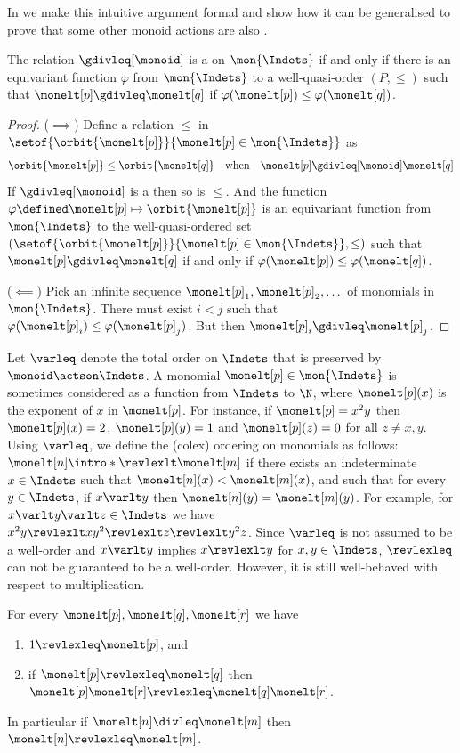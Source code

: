 In  we make this intuitive argument formal and show how it can be generalised to prove that some other monoid actions are also .
%
\begin{lemma}
The relation $\gdivleq[\monoid]$ is a  on $\mon{\Indets}$ if and only if there is an equivariant function $\varphi$ from $\mon{\Indets}$ to a well-quasi-order $(P,\leq)$ such that $\monelt[p] \gdivleq \monelt[q]$ if $\varphi(\monelt[p]) \leq \varphi(\monelt[q])$.
\end{lemma}
%
\begin{proof}
($\implies$)
Define a relation $\leq$ in $\setof{\orbit{\monelt[p]}}{\monelt[p]\in\mon{\Indets}}$ as
\[
\orbit{\monelt[p]} \leq \orbit{\monelt[q]}
\quad\text{when}\quad \monelt[p] \gdivleq[\monoid] \monelt[q]
\]
If $\gdivleq[\monoid]$ is a  then so is $\leq$.
And the function $\varphi \defined \monelt[p] \mapsto \orbit{\monelt[p]}$ is an equivariant function from $\mon{\Indets}$ to the well-quasi-ordered set $(\setof{\orbit{\monelt[p]}}{\monelt[p]\in\mon{\Indets}},\leq)$ such that $\monelt[p] \gdivleq \monelt[q]$ if and only if $\varphi(\monelt[p]) \leq \varphi(\monelt[q])$.

\noindent($\impliedby$)
Pick an infinite sequence $\monelt[p]_1,\monelt[p]_2,\dots$ of monomials in $\mon{\Indets}$.
There must exist $i < j$ such that $\varphi(\monelt[p]_i) \leq \varphi(\monelt[p]_j)$.
But then $\monelt[p]_i \gdivleq \monelt[p]_j$.
\end{proof}
%
Let $\varleq$ denote the total order on $\Indets$ that is preserved by $\monoid\actson\Indets$.
A monomial $\monelt[p]\in\mon{\Indets}$ is sometimes considered as a function from $\Indets$ to $\N$,
where $\monelt[p](x)$ is the exponent of $x$ in $\monelt[p]$.
For instance, if $\monelt[p] = x^2y$ then $\monelt[p](x) = 2$, $\monelt[p](y) = 1$ and $\monelt[p](z) = 0$ for all $z\neq x,y$.
Using $\varleq$, we define the  (colex) ordering on monomials as
follows: $\monelt[n] \intro*\revlexlt \monelt[m]$ if there exists an
indeterminate $x \in \Indets$ such that $\monelt[n](x) < \monelt[m](x)$, and such
that for every $y \in \Indets$, if $x \varlt y$ then $\monelt[n](y) =
\monelt[m](y)$.
For example,
for $x \varlt y \varlt z \in\Indets$ we have
$x^2 y \revlexlt xy^2 \revlexlt z \revlexlt y^2z$.
%
Since $\varleq$ is not assumed to be a well-order and $x \varlt y$ implies $x \revlexlt y$ for $x,y\in\Indets$,
$\revlexleq$ can not be guaranteed to be a well-order.
However, it is still well-behaved with respect to multiplication.
\begin{lemma}
For every $\monelt[p],\monelt[q],\monelt[r]$ we have
\begin{enumerate}
\item $1 \revlexleq \monelt[p]$, and
\item if $\monelt[p] \revlexleq \monelt[q]$ then $\monelt[p]\monelt[r] \revlexleq \monelt[q]\monelt[r]$.
\end{enumerate}
\end{lemma}
%
In particular if $\monelt[n] \divleq \monelt[m]$ then $\monelt[n] \revlexleq \monelt[m]$. 

